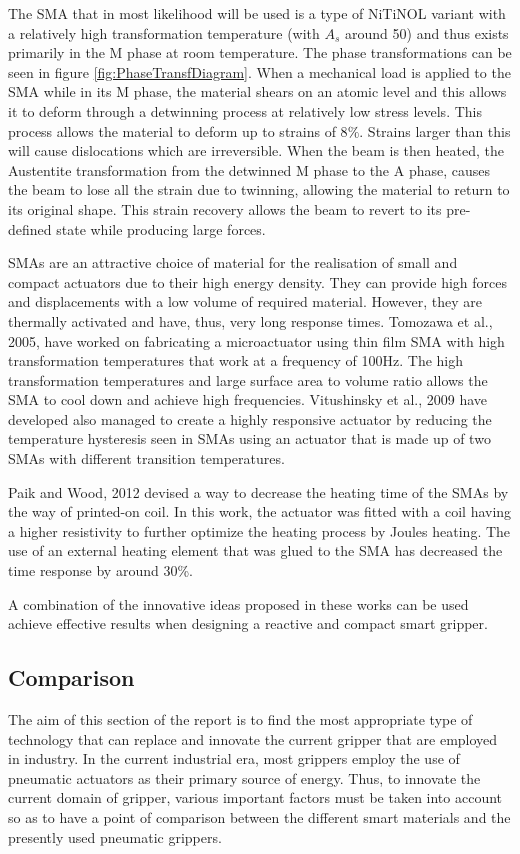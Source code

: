 The SMA that in most likelihood will be used is a type of NiTiNOL variant with a relatively high transformation temperature (with $A_s$ around 50\degreeC) and thus exists primarily in the M phase at room temperature. The phase transformations can be seen in figure \ref{fig:PhaseTransfDiagram}. When a mechanical load is applied to the SMA while in its M phase, the material shears on an atomic level and this allows it to deform through a detwinning process at relatively low stress levels. This process allows the material to deform up to strains of 8$\%$. Strains larger than this will cause dislocations which are irreversible. When the beam is then heated, the Austentite transformation from the detwinned M phase to the A phase, causes the beam to lose all the strain due to twinning, allowing the material to return to its original shape. This strain recovery allows the beam to revert to its pre-defined state while producing large forces.

SMAs are an attractive choice of material for the realisation of small and compact actuators due to their high energy density. They can provide high forces and displacements with a low volume of required material. However, they are thermally activated and have, thus, very long response times. Tomozawa et al.\cite{tomozawa_characterization_2005}, 2005, have worked on fabricating a microactuator using thin film SMA with high transformation temperatures that work at a frequency of 100Hz. The high transformation temperatures and large surface area to volume ratio allows the SMA to cool down and achieve high frequencies. Vitushinsky et al.\cite{vitushinsky_bistable_2009}, 2009 have developed also managed to create a highly responsive actuator by reducing the temperature hysteresis seen in SMAs using an actuator that is made up of two SMAs with different transition temperatures.

Paik and Wood\cite{paik_bidirectional_2012, paik_novel_2010}, 2012 devised a way to decrease the heating time of the SMAs by the way of printed-on coil. In this work, the actuator was fitted with a coil having a higher resistivity to further optimize the heating process by Joules heating. The use of an external heating element that was glued to the SMA has decreased the time response by around 30\%.

A combination of the innovative ideas proposed in these works can be used achieve effective results when designing a reactive and compact smart gripper.

\subsection{Comparison}
The aim of this section of the report is to find the most appropriate type of technology that can replace and innovate the current gripper that are employed in industry. In the current industrial era, most grippers employ the use of pneumatic actuators as their primary source of energy. Thus, to innovate the current domain of gripper, various important factors must be taken into account so as to have a point of comparison between the different smart materials and the presently used pneumatic grippers.

